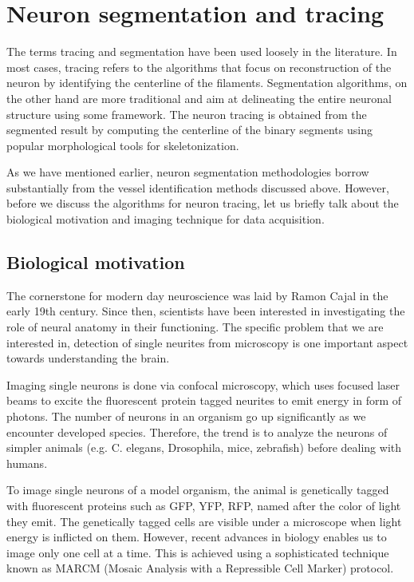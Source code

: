 \section{Neuron segmentation and tracing}

The terms tracing and segmentation have been used loosely in the literature. In most cases, tracing refers to the algorithms that focus on reconstruction of the neuron by identifying the centerline of the filaments. Segmentation algorithms, on the other hand are more traditional and aim at delineating the entire neuronal structure using some framework. The neuron tracing is obtained from the segmented result by computing the centerline of the binary segments using popular morphological tools for skeletonization. 
 
As we have mentioned earlier, neuron segmentation methodologies borrow substantially from the vessel identification methods discussed above. However, before we discuss the algorithms for neuron tracing, let us briefly talk about the biological motivation and imaging technique for data acquisition.

\subsection{Biological motivation}

The cornerstone for modern day neuroscience was laid by Ramon Cajal in the early 19th century. Since then, scientists have been interested in investigating the role of neural anatomy in their functioning. The specific problem that we are interested in, detection of single neurites from microscopy is one important aspect towards understanding the brain.

Imaging single neurons is done via confocal microscopy, which uses focused laser beams to excite the fluorescent protein tagged neurites to emit energy in form of photons. The number of neurons in an organism go up significantly as we encounter developed species. Therefore, the trend is to analyze the neurons of simpler animals (e.g. C. elegans, Drosophila, mice, zebrafish) before dealing with humans. 

To image single neurons of a model organism, the animal is genetically tagged with fluorescent proteins such as GFP, YFP, RFP, named after the color of light they emit. The genetically tagged cells are visible under a microscope when light energy is inflicted on them. However, recent advances in biology enables us to image only one cell at a time. This is achieved using a sophisticated technique known as MARCM (Mosaic Analysis with a Repressible Cell Marker) protocol. 

